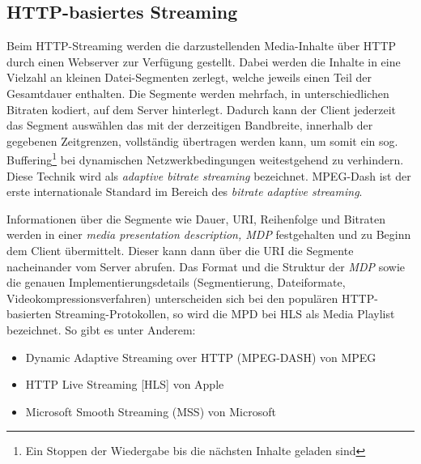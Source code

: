 \subsection{HTTP-basiertes Streaming}
\label{subsec:HttpBasiertesLiveStreaming}
Beim HTTP-Streaming werden die darzustellenden Media-Inhalte über HTTP durch einen Webserver zur Verfügung gestellt.
Dabei werden die Inhalte in eine Vielzahl an kleinen Datei-Segmenten zerlegt, welche jeweils einen Teil der Gesamtdauer enthalten.
Die Segmente werden mehrfach, in unterschiedlichen Bitraten kodiert, auf dem Server hinterlegt.
Dadurch kann der Client jederzeit das Segment auswählen das mit der derzeitigen Bandbreite, innerhalb der gegebenen Zeitgrenzen, vollständig übertragen werden kann,
um somit ein sog.
Buffering\footnote{Ein Stoppen der Wiedergabe bis die nächsten Inhalte geladen sind} bei dynamischen Netzwerkbedingungen weitestgehend zu verhindern.
Diese Technik wird als \textit{adaptive bitrate streaming} bezeichnet\parencite{Sodagar2011}\parencite{Sodagar2012Paper}.
MPEG-Dash ist der erste internationale Standard im Bereich des \textit{bitrate adaptive streaming}\parencite{MPEG2011}.

Informationen über die Segmente wie Dauer, URI, Reihenfolge und Bitraten werden in einer \textit{media presentation description, MDP} festgehalten und zu Beginn dem
Client übermittelt.\parencite[Seite 3]{Pantos2020}
Dieser kann dann über die URI die Segmente nacheinander vom Server abrufen.
Das Format und die Struktur der \textit{MDP} sowie die genauen Implementierungsdetails (Segmentierung, Dateiformate, Videokompressionsverfahren) unterscheiden
sich bei den populären HTTP-basierten Streaming-Protokollen, so wird die MPD bei HLS als Media Playlist bezeichnet\parencite{Pantos2020}.
So gibt es unter Anderem:
\begin{itemize}
    \item Dynamic Adaptive Streaming over HTTP (MPEG-DASH) von MPEG
    \item HTTP Live Streaming [HLS] von Apple
    \item Microsoft Smooth Streaming (MSS) von Microsoft
\end{itemize}

